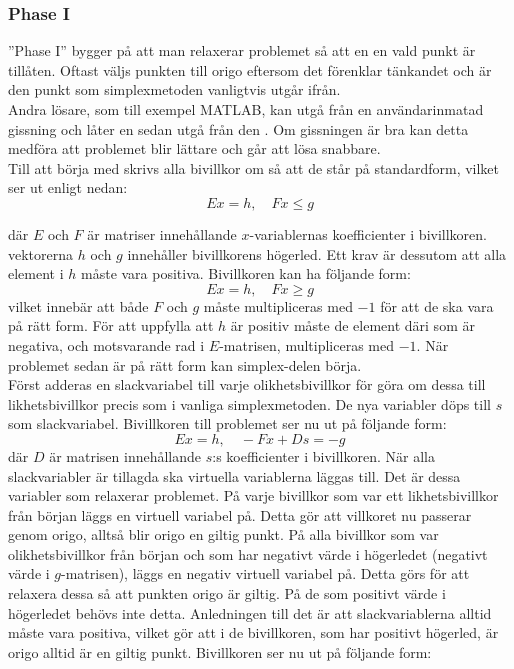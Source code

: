 \subsubsection{Phase I}
''Phase I'' bygger på att man relaxerar problemet så att en en vald punkt är tillåten. Oftast väljs punkten till origo eftersom det förenklar tänkandet och är den punkt som simplexmetoden vanligtvis utgår ifrån. \citep{numericaloptimization} \\
Andra lösare, som till exempel MATLAB, kan utgå från en användarinmatad gissning och låter en sedan utgå från den \citep{quadprog}. Om gissningen är bra kan detta medföra att problemet blir lättare och går att lösa snabbare. \\
Till att börja med skrivs alla bivillkor om så att de står på standardform, vilket ser ut enligt nedan:
$$Ex = h, \quad Fx \leq g$$
\raggedright där $E$ och $F$ är matriser innehållande $x$-variablernas koefficienter i bivillkoren. vektorerna $h$ och $g$ innehåller bivillkorens högerled. Ett krav är dessutom att alla element i $h$ måste vara positiva.
Bivillkoren kan ha följande form: \citep{numericaloptimization}
$$Ex = h, \quad Fx \geq g$$
vilket innebär att både $F$ och $g$ måste multipliceras med $-1$ för att de ska vara på rätt form. För att uppfylla att $h$ är positiv måste de element däri som är negativa, och motsvarande rad i $E$-matrisen, multipliceras med $-1$.
När problemet sedan är på rätt form kan simplex-delen börja. \\
Först adderas en slackvariabel till varje olikhetsbivillkor för göra om dessa till likhetsbivillkor precis som i vanliga simplexmetoden. De nya variabler döps till $s$ som slackvariabel. Bivillkoren till problemet ser nu ut på följande form: \citep{numericaloptimization}
$$Ex = h, \quad -Fx+Ds = -g$$
där $D$ är matrisen innehållande $s$:s koefficienter i bivillkoren.
När alla slackvariabler är tillagda ska virtuella variablerna läggas till. Det är dessa variabler som relaxerar problemet. På varje bivillkor som var ett likhetsbivillkor från början läggs en virtuell variabel på. Detta gör att villkoret nu passerar genom origo, alltså blir origo en giltig punkt. På alla bivillkor som var olikhetsbivillkor från början och som har negativt värde i högerledet (negativt värde i $g$-matrisen), läggs en negativ virtuell variabel på. Detta görs för att relaxera dessa så att punkten origo är giltig. På de som positivt värde i högerledet behövs inte detta. Anledningen till det är att slackvariablerna alltid måste vara positiva, vilket gör att i de bivillkoren, som har positivt högerled, är origo alltid är en giltig punkt. Bivillkoren ser nu ut på följande form: \citep{numericaloptimization}
